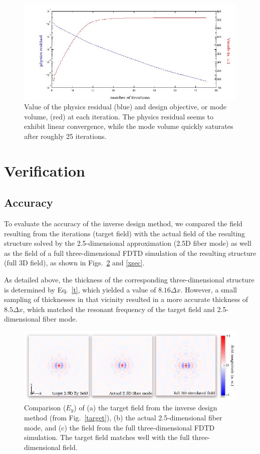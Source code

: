 \begin{figure}[hbt]
\centering\includegraphics[width=\textwidth]{p2/the_prog}
\caption{Value of the physics residual (blue) and design objective, or mode volume, (red) at each iteration. The physics residual seems to exhibit linear convergence, while the mode volume quickly saturates after roughly 25 iterations.}\label{progress}
\end{figure}

\section{Verification} %
\subsection{Accuracy}
To evaluate the accuracy of the inverse design method, we compared the field resulting from the iterations (target field) with the actual field of the resulting structure solved by the 2.5-dimensional approximation (2.5D fiber mode) as well as the field of a full three-dimensional FDTD simulation of the resulting structure (full 3D field), as shown in Figs.~\ref{comp} and \ref{xsec}.

As detailed above, the thickness of the corresponding three-dimensional structure is determined by Eq.~\ref{t}, which yielded a value of $8.16 \Delta x$. However, a small sampling of thicknesses in that vicinity resulted in a more accurate thickness of $8.5\Delta x$, which matched the resonant frequency of the target field and 2.5-dimensional fiber mode.
\begin{figure}[hbt]
\centering\includegraphics[width=\textwidth]{p2/compare}
\caption{Comparison ($E_y$) of (a) the target field from the inverse design method (from Fig.~\ref{target}), (b) the actual 2.5-dimensional fiber mode, and (c) the field from the full three-dimensional FDTD simulation. The target field matches well with the full three-dimensional field.}\label{comp}
\end{figure}

